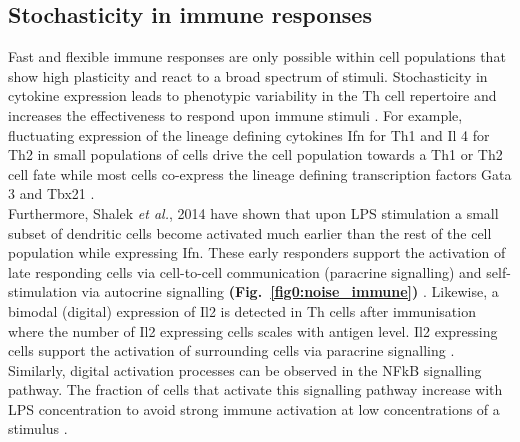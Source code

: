 
\subsection{Stochasticity in immune responses}

Fast and flexible immune responses are only possible within cell populations that show high plasticity and react to a broad spectrum of stimuli. 
Stochasticity in cytokine expression leads to phenotypic variability in the \Gls{Th} cell repertoire and increases the effectiveness to respond upon immune stimuli \citep{Schrom2017}. 
For example, fluctuating expression of the lineage defining cytokines \gls{Ifn}\textgamma{} for Th1 and \gls{Il} 4 for Th2 in small populations of cells drive the cell population towards a Th1 or Th2 cell fate while most cells co-express the lineage defining transcription factors \Gls{Gata} 3 and \Gls{Tbx21} \citep{Fang2013a, Antebi2013}.\\

Furthermore, Shalek \textit{et al.}, 2014 have shown that upon \gls{LPS} stimulation a small subset of dendritic cells become activated much earlier than the rest of the cell population while expressing \gls{Ifn}\textbeta. 
These early responders support the activation of late responding cells via cell-to-cell communication (paracrine signalling) and self-stimulation via autocrine signalling \textbf{(Fig.~\ref{fig0:noise_immune})} \citep{Shalek2014}. 
Likewise, a bimodal (digital) expression of Il2 is detected in \gls{Th} cells after immunisation where the number of Il2 expressing cells scales with antigen level. 
Il2 expressing cells support the activation of surrounding cells via paracrine signalling \citep{Fuhrmann2016}. 
Similarly, digital activation processes can be observed in the \gls{NFkB} signalling pathway. 
The fraction of cells that activate this signalling pathway increase with LPS concentration to avoid strong immune activation at low concentrations of a stimulus \citep{Kellogg2015b}.

